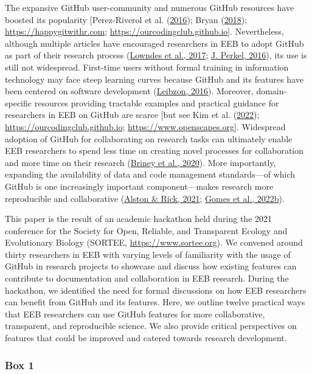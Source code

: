 The expansive GitHub user-community and numerous GitHub resources have boosted its popularity {[}Perez-Riverol et al. (\protect\hyperlink{ref-kEX5dgzK}{2016}); Bryan (\protect\hyperlink{ref-RVetqmsg}{2018}); \url{https://happygitwithr.com}; \url{https://ourcodingclub.github.io}{]}.
Nevertheless, although multiple articles have encouraged researchers in EEB to adopt GitHub as part of their research process (\protect\hyperlink{ref-3DKwn1sY}{Lowndes et al., 2017}; \protect\hyperlink{ref-10ghgV3S8}{J. Perkel, 2016}), its use is still not widespread.
First-time users without formal training in information technology may face steep learning curves because GitHub and its features have been centered on software development (\protect\hyperlink{ref-139b0pSGc}{Leibzon, 2016}).
Moreover, domain-specific resources providing tractable examples and practical guidance for researchers in EEB on GitHub are scarce {[}but see Kim et al. (\protect\hyperlink{ref-lJAgyhYq}{2022}); \url{https://ourcodingclub.github.io}; \url{https://www.openscapes.org}{]}.
Widespread adoption of GitHub for collaborating on research tasks can ultimately enable EEB researchers to spend less time on creating novel processes for collaboration and more time on their research (\protect\hyperlink{ref-ydrk01SR}{Briney et al., 2020}).
More importantly, expanding the availability of data and code management standards---of which GitHub is one increasingly important component---makes research more reproducible and collaborative (\protect\hyperlink{ref-13QX8XU3J}{Alston \& Rick, 2021}; \protect\hyperlink{ref-pq2Tv1BC}{Gomes et al., 2022b}).

This paper is the result of an academic hackathon held during the 2021 conference for the Society for Open, Reliable, and Transparent Ecology and Evolutionary Biology (SORTEE, \url{https://www.sortee.org}).
We convened around thirty researchers in EEB with varying levels of familiarity with the usage of GitHub in research projects to showcase and discuss how existing features can contribute to documentation and collaboration in EEB research.
During the hackathon, we identified the need for formal discussions on how EEB researchers can benefit from GitHub and its features.
Here, we outline twelve practical ways that EEB researchers can use GitHub features for more collaborative, transparent, and reproducible science.
We also provide critical perspectives on features that could be improved and catered towards research development.

\hypertarget{definitions}{%
\subsubsection{Box 1}\label{definitions}}

